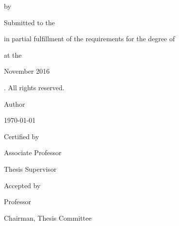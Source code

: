 \documentclass[
  12pt, %
  english, %
  doublespacing, %
]{setting} %
\author{Yee Shian Henry Tong} %
\newcommand\blankpage{
  \null
  \thispagestyle{empty}
  \addtocounter{page}{-1}
  \newpage
}
\begin{document}
\frontmatter %
\pagestyle{plain} %


\afterpage{\blankpage} %



\begin{titlepage}
  \begin{center} 
    {\Large \bfseries \ttitle \par}
    \bigskip
    {\normalsize by \par}
    \bigskip
    {\large \authorname \par}
    \bigskip
    {\normalsize Submitted to the \deptname \par in partial fulfillment of the requirements for the degree of \par}
    \bigskip
    {\large \degreename \par}
    \bigskip    
    {at the \par}
    \bigskip
    {\large \MakeUppercase{\univname} \par}
    \bigskip
    {\normalsize November 2016 \par}
    \bigskip
    {\textcopyright \space \univname {}. All rights reserved. \par}
    \bigskip \bigskip \bigskip 
    \begin{flushleft}
      {\large Author \dotfill \par}
    \end{flushleft}
    \begin{flushright} 
      {\deptname \par \today \par}
    \end{flushright}
    \begin{flushleft}
      {\large Certified by \dotfill \par}
    \end{flushleft}
    \begin{flushright} 
      {\supname \par Associate Professor \par Thesis Supervisor \par}
    \end{flushright}
    \begin{flushleft}
      {\large Accepted by \dotfill \par}
    \end{flushleft}
    \begin{flushright} 
      {\examname \par Professor \par Chairman, Thesis Committee \par}
    \end{flushright}
  \end{center}
\end{titlepage}
\end{document}
